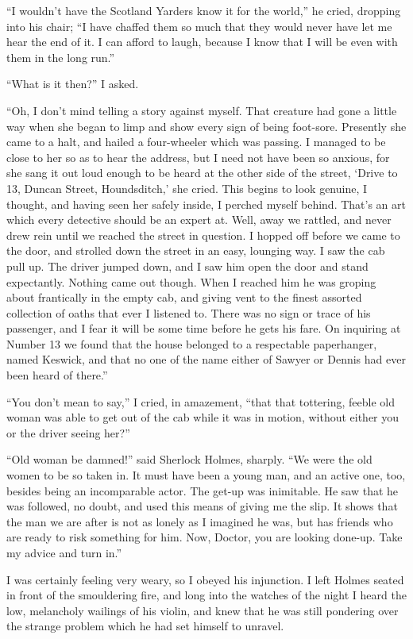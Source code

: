 \documentclass[12pt,english,oneside]{book}
\begin{document}
{}``I wouldn't have the Scotland Yarders know it for the world,''
he cried, dropping into his chair; {}``I have chaffed them so much
that they would never have let me hear the end of it. I can afford
to laugh, because I know that I will be even with them in the long
run.''

{}``What is it then?'' I asked.

{}``Oh, I don't mind telling a story against myself. That creature
had gone a little way when she began to limp and show every sign of
being foot-sore. Presently she came to a halt, and hailed a four-wheeler
which was passing. I managed to be close to her so as to hear the
address, but I need not have been so anxious, for she sang it out
loud enough to be heard at the other side of the street, `Drive to
13, Duncan Street, Houndsditch,' she cried. This begins to look genuine,
I thought, and having seen her safely inside, I perched myself behind.
That's an art which every detective should be an expert at. Well,
away we rattled, and never drew rein until we reached the street in
question. I hopped off before we came to the door, and strolled down
the street in an easy, lounging way. I saw the cab pull up. The driver
jumped down, and I saw him open the door and stand expectantly. Nothing
came out though. When I reached him he was groping about frantically
in the empty cab, and giving vent to the finest assorted collection
of oaths that ever I listened to. There was no sign or trace of his
passenger, and I fear it will be some time before he gets his fare.
On inquiring at Number 13 we found that the house belonged to a respectable
paperhanger, named Keswick, and that no one of the name either of
Sawyer or Dennis had ever been heard of there.''

{}``You don't mean to say,'' I cried, in amazement, {}``that that
tottering, feeble old woman was able to get out of the cab while it
was in motion, without either you or the driver seeing her?''

{}``Old woman be damned!'' said Sherlock Holmes, sharply. {}``We
were the old women to be so taken in. It must have been a young man,
and an active one, too, besides being an incomparable actor. The get-up
was inimitable. He saw that he was followed, no doubt, and used this
means of giving me the slip. It shows that the man we are after is
not as lonely as I imagined he was, but has friends who are ready
to risk something for him. Now, Doctor, you are looking done-up. Take
my advice and turn in.''

I was certainly feeling very weary, so I obeyed his injunction. I
left Holmes seated in front of the smouldering fire, and long into
the watches of the night I heard the low, melancholy wailings of his
violin, and knew that he was still pondering over the strange problem
which he had set himself to unravel.
\end{document}
